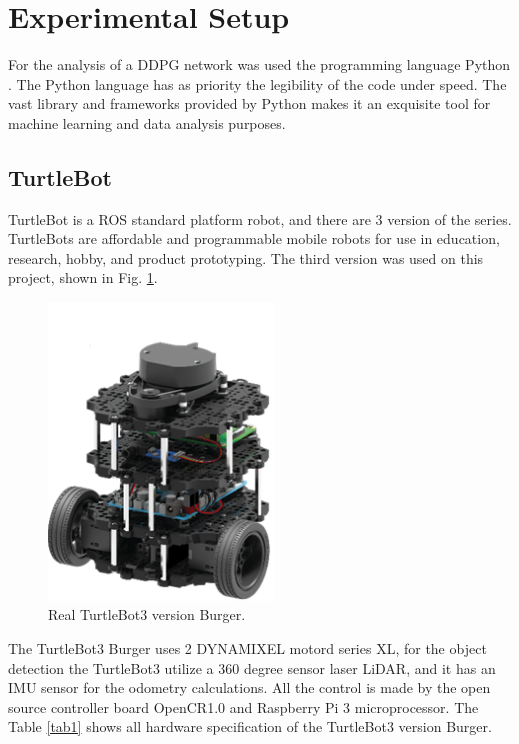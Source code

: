 \section*{Experimental Setup}

For the analysis of a DDPG network was used the programming language Python \cite{ascher1999learning}. 
The Python language has as priority the legibility of the code under speed. 
The vast library and frameworks provided by Python makes it an exquisite tool for machine learning and data analysis purposes.

\subsection*{TurtleBot}

TurtleBot is a ROS standard platform robot, and there are 3 version of the series. TurtleBots are affordable and programmable mobile robots for use in education, research, hobby, and product prototyping.
The third version was used on this project, shown in Fig. \ref{fig:turtlebot3}.

\begin{figure}[H]
\centerline{\includegraphics[width=6cm]{images/burger_real.png}}
\caption{Real TurtleBot3 version Burger.}
\label{fig:turtlebot3}
\end{figure}

The TurtleBot3 Burger uses 2 DYNAMIXEL motord series XL, for the object detection the TurtleBot3 utilize a 360 degree sensor laser LiDAR, and it has an IMU sensor for the odometry calculations.
All the control is made by the open source controller board OpenCR1.0 and Raspberry Pi 3 microprocessor.
The Table \ref{tab1} shows all hardware specification of the TurtleBot3 version Burger.


